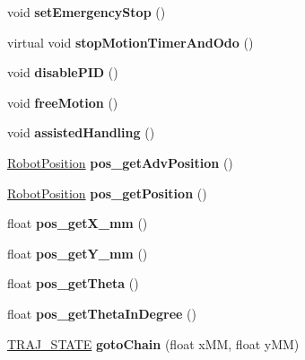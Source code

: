 \begin{DoxyCompactItemize}
\item 
\mbox{\label{classAsserv_a312602d6bf6f8591937e4d0003497bbb}} 
void {\bfseries set\+Emergency\+Stop} ()
\item 
\mbox{\label{classAsserv_af3ac6ea471cb2fb8713ce32bbc05d66e}} 
virtual void {\bfseries stop\+Motion\+Timer\+And\+Odo} ()
\item 
\mbox{\label{classAsserv_aa8b9209374a094acf3242d732cdeee5e}} 
void {\bfseries disable\+P\+ID} ()
\item 
\mbox{\label{classAsserv_aef3c037b15172c4cc015c47a33f93634}} 
void {\bfseries free\+Motion} ()
\item 
\mbox{\label{classAsserv_a2d4c545965ac32ef54c9b118d3576655}} 
void {\bfseries assisted\+Handling} ()
\item 
\mbox{\label{classAsserv_a7b4da229e99922c338cef82d645875d6}} 
\hyperlink{structRobotPosition}{Robot\+Position} {\bfseries pos\+\_\+get\+Adv\+Position} ()
\item 
\mbox{\label{classAsserv_a91bb1a510149cf8bc30ec40848732eaa}} 
\hyperlink{structRobotPosition}{Robot\+Position} {\bfseries pos\+\_\+get\+Position} ()
\item 
\mbox{\label{classAsserv_a871088db63d1a0e20ccbf387c6f895db}} 
float {\bfseries pos\+\_\+get\+X\+\_\+mm} ()
\item 
\mbox{\label{classAsserv_a2cca6401ccf8cfc7cc927177cba14f4a}} 
float {\bfseries pos\+\_\+get\+Y\+\_\+mm} ()
\item 
\mbox{\label{classAsserv_a11fc2df956a191f42ab34088a7ae9ce0}} 
float {\bfseries pos\+\_\+get\+Theta} ()
\item 
\mbox{\label{classAsserv_a0c1a1048174322c00dfba79c74193bd1}} 
float {\bfseries pos\+\_\+get\+Theta\+In\+Degree} ()
\item 
\mbox{\label{classAsserv_a8d3855dc9eddaff07b58a7a01e2024c3}} 
\hyperlink{path__manager_8h_adb3360abeb29758da93865c8afcb80eb}{T\+R\+A\+J\+\_\+\+S\+T\+A\+TE} {\bfseries goto\+Chain} (float x\+MM, float y\+MM)

\end{DoxyCompactItemize}

